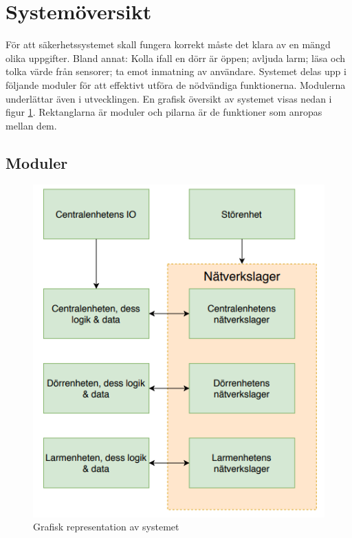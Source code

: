\documentclass[a4paper]{article}
\begin{document}
\newpage
\section{Systemöversikt}
\label{sec:systemöversikt}
För att säkerhetssystemet skall fungera korrekt måste det klara av en mängd olika uppgifter. Bland annat: Kolla ifall en dörr är öppen; avljuda larm; läsa och tolka värde från sensorer; ta emot inmatning av användare. Systemet delas upp i följande moduler för att effektivt utföra de nödvändiga funktionerna. Modulerna underlättar även i utvecklingen. En grafisk översikt av systemet visas nedan i figur \ref{fig:systemoversikt}. Rektanglarna är moduler och pilarna är de funktioner som anropas mellan dem.


\subsection{Moduler}
\label{sec:Moduler}
\begin{figure}[h]
    \centering
    \includegraphics{dokumentation/projektplan/systemoversikt.png}
    \caption{Grafisk representation av systemet}
    \label{fig:systemoversikt}
\end{figure}
\end{document}
